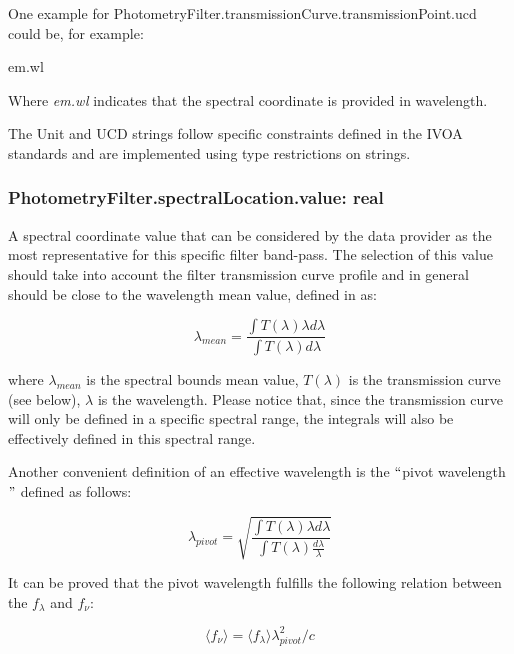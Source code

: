 \documentclass[11pt,a4paper]{ivoa}
\begin{document}
One example for PhotometryFilter.transmissionCurve.transmissionPoint.ucd could be, for example:
\par

em.wl

Where \textit{em.wl }indicates that the spectral coordinate is provided in wavelength.
\par

The Unit and UCD strings follow specific constraints defined in the IVOA standards and are
implemented using type restrictions on strings.
\par


\subsubsection{PhotometryFilter.spectralLocation.value: real}
A spectral coordinate value that can be considered by the data provider as the
most representative for this specific filter band-pass. The selection of this
value should take into account the filter transmission curve profile and in
general should be close to the wavelength mean value, defined
in \citet{1982AJ.....87..670O} as:
\par
\begin{equation} \label{eq:16}
\lambda_{mean} = \frac{\int T(\lambda)\lambda d\lambda}{\int T(\lambda)d\lambda}
\end{equation}

where $\lambda_{mean}$ is the spectral bounds mean value, $T(\lambda)$ is
the transmission curve (see below), $\lambda$ is the wavelength. Please
notice that, since the transmission curve will only be defined in a specific
spectral range, the integrals will also be effectively defined in this
spectral range.
\par

Another convenient definition of an effective wavelength is the
$``$pivot wavelength$"$  defined as follows:

\begin{equation} \label{eq:17}
\lambda_{pivot} = \sqrt{\frac{\int T(\lambda)\lambda d\lambda}{\int T(\lambda)\frac{d\lambda}{\lambda}}}
\end{equation}

It can be proved that the pivot wavelength fulfills the following
relation between the $f_\lambda$ and  $f_\nu $:

\begin{equation} \label{eq:18}
\langle f_\nu \rangle =\langle f_\lambda \rangle \lambda^2_{pivot}/c
\end{equation}
\end{document}
